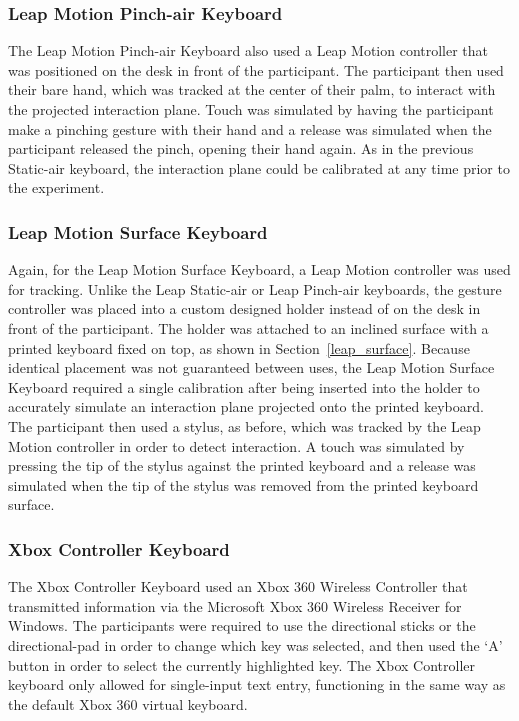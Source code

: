 \subsubsection{Leap Motion Pinch-air Keyboard}
The Leap Motion Pinch-air Keyboard also used a Leap Motion controller that was positioned on the desk in front of the participant. The participant then used their bare hand, which was tracked at the center of their palm, to interact with the projected interaction plane. Touch was simulated by having the participant make a pinching gesture with their hand and a release was simulated when the participant released the pinch, opening their hand again. As in the previous Static-air keyboard, the interaction plane could be calibrated at any time prior to the experiment.

\subsubsection{Leap Motion Surface Keyboard}
Again, for the Leap Motion Surface Keyboard, a Leap Motion controller was used for tracking. Unlike the Leap Static-air or Leap Pinch-air keyboards, the gesture controller was placed into a custom designed holder instead of on the desk in front of the participant. The holder was attached to an inclined surface with a printed keyboard fixed on top, as shown in Section~\ref{leap_surface}. Because identical placement was not guaranteed between uses, the Leap Motion Surface Keyboard required a single calibration after being inserted into the holder to accurately simulate an interaction plane projected onto the printed keyboard. The participant then used a stylus, as before, which was tracked by the Leap Motion controller in order to detect interaction. A touch was simulated by pressing the tip of the stylus against the printed keyboard and a release was simulated when the tip of the stylus was removed from the printed keyboard surface.

\subsubsection{Xbox Controller Keyboard}
The Xbox Controller Keyboard used an Xbox 360 Wireless Controller that transmitted information via the Microsoft Xbox 360 Wireless Receiver for Windows. The participants were required to use the directional sticks or the directional-pad in order to change which key was selected, and then used the `A' button in order to select the currently highlighted key. The Xbox Controller keyboard only allowed for single-input text entry, functioning in the same way as the default Xbox 360 virtual keyboard.

